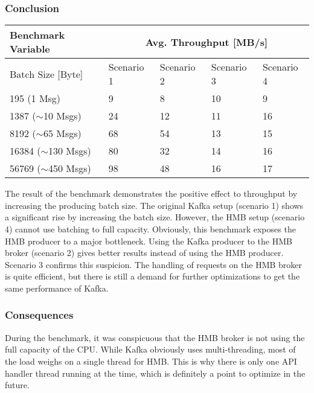\newpage
\subsubsection{Conclusion}
\begin{table}[H]
\centering
\begin{tabular}{|l|l|l|l|l|}
\hline
{\bf Benchmark Variable} & \multicolumn{4}{c|}{{\bf Avg. Throughput {[}MB/s{]}}} \\ \hline \hline
Batch Size [Byte]        & Scenario 1       & Scenario 2       & Scenario 3   & Scenario 4   \\ \hline
195  (1 Msg)             & 9                & 8                & 10           & 9            \\ \hline
1387 ($\sim$10 Msgs)     & 24               & 12               & 11           & 16           \\ \hline
8192 ($\sim$65 Msgs)     & 68               & 54               & 13           & 15           \\ \hline
16384 ($\sim$130 Msgs)   & 80               & 32               & 14           & 16           \\ \hline
56769 ($\sim$450 Msgs)   & 98               & 48               & 16           & 17           \\ \hline
\end{tabular}
\end{table}

The result of the benchmark demonstrates the positive effect to throughput
by increasing the producing batch size. The original Kafka setup (scenario 1)
shows a significant rise by increasing the batch size. However, the
HMB setup (scenario 4) cannot use batching to full capacity. Obviously, this
benchmark exposes the HMB producer to a major bottleneck. Using the Kafka
producer to the HMB broker (scenario 2) gives better results instead of
using the HMB producer. Scenario 3 confirms this suspicion. The handling
of requests on the HMB broker is quite efficient, but there is still a demand
for further optimizations to get the same performance of Kafka.

\subsubsection{Consequences}
During the benchmark, it was conspicuous that the HMB broker is
not using the full capacity of the CPU. While Kafka obviously uses
multi-threading, most of the load weighs on a single thread for HMB. This is why
there is only one API handler thread running at the time, which is definitely
a point to optimize in the future.


